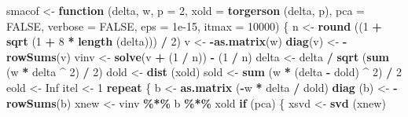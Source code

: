 \documentclass[
  12pt,
]{article}
\newenvironment{Shaded}{\begin{snugshade}}{\end{snugshade}}
\newcommand{\AttributeTok}[1]{\textcolor[rgb]{0.13,0.29,0.53}{#1}}
\newcommand{\ConstantTok}[1]{\textcolor[rgb]{0.56,0.35,0.01}{#1}}
\newcommand{\ControlFlowTok}[1]{\textcolor[rgb]{0.13,0.29,0.53}{\textbf{#1}}}
\newcommand{\DecValTok}[1]{\textcolor[rgb]{0.00,0.00,0.81}{#1}}
\newcommand{\FloatTok}[1]{\textcolor[rgb]{0.00,0.00,0.81}{#1}}
\newcommand{\FunctionTok}[1]{\textcolor[rgb]{0.13,0.29,0.53}{\textbf{#1}}}
\newcommand{\NormalTok}[1]{#1}
\newcommand{\OtherTok}[1]{\textcolor[rgb]{0.56,0.35,0.01}{#1}}
\newcommand{\SpecialCharTok}[1]{\textcolor[rgb]{0.81,0.36,0.00}{\textbf{#1}}}
\begin{document}
\begin{Shaded}
\begin{Highlighting}[]
\NormalTok{smacof }\OtherTok{\textless{}{-}}
  \ControlFlowTok{function}\NormalTok{ (delta,}
\NormalTok{            w,}
            \AttributeTok{p =} \DecValTok{2}\NormalTok{,}
            \AttributeTok{xold =} \FunctionTok{torgerson}\NormalTok{ (delta, p),}
            \AttributeTok{pca =} \ConstantTok{FALSE}\NormalTok{,}
            \AttributeTok{verbose =} \ConstantTok{FALSE}\NormalTok{,}
            \AttributeTok{eps =} \FloatTok{1e{-}15}\NormalTok{,}
            \AttributeTok{itmax =} \DecValTok{10000}\NormalTok{) \{}
\NormalTok{    n }\OtherTok{\textless{}{-}} \FunctionTok{round}\NormalTok{ ((}\DecValTok{1} \SpecialCharTok{+} \FunctionTok{sqrt}\NormalTok{ (}\DecValTok{1} \SpecialCharTok{+} \DecValTok{8} \SpecialCharTok{*} \FunctionTok{length}\NormalTok{ (delta))) }\SpecialCharTok{/} \DecValTok{2}\NormalTok{)}
\NormalTok{    v }\OtherTok{\textless{}{-}} \SpecialCharTok{{-}}\FunctionTok{as.matrix}\NormalTok{(w)}
    \FunctionTok{diag}\NormalTok{(v) }\OtherTok{\textless{}{-}} \SpecialCharTok{{-}}\FunctionTok{rowSums}\NormalTok{(v)}
\NormalTok{    vinv }\OtherTok{\textless{}{-}} \FunctionTok{solve}\NormalTok{(v }\SpecialCharTok{+}\NormalTok{ (}\DecValTok{1} \SpecialCharTok{/}\NormalTok{ n)) }\SpecialCharTok{{-}}\NormalTok{ (}\DecValTok{1} \SpecialCharTok{/}\NormalTok{ n)}
\NormalTok{    delta }\OtherTok{\textless{}{-}}\NormalTok{ delta }\SpecialCharTok{/} \FunctionTok{sqrt}\NormalTok{ (}\FunctionTok{sum}\NormalTok{ (w }\SpecialCharTok{*}\NormalTok{ delta }\SpecialCharTok{\^{}} \DecValTok{2}\NormalTok{) }\SpecialCharTok{/} \DecValTok{2}\NormalTok{)}
\NormalTok{    dold }\OtherTok{\textless{}{-}} \FunctionTok{dist}\NormalTok{ (xold)}
\NormalTok{    sold }\OtherTok{\textless{}{-}} \FunctionTok{sum}\NormalTok{ (w }\SpecialCharTok{*}\NormalTok{ (delta }\SpecialCharTok{{-}}\NormalTok{ dold) }\SpecialCharTok{\^{}} \DecValTok{2}\NormalTok{) }\SpecialCharTok{/} \DecValTok{2}
\NormalTok{    eold }\OtherTok{\textless{}{-}} \ConstantTok{Inf}
\NormalTok{    itel }\OtherTok{\textless{}{-}} \DecValTok{1}
    \ControlFlowTok{repeat}\NormalTok{ \{}
\NormalTok{      b }\OtherTok{\textless{}{-}} \FunctionTok{as.matrix}\NormalTok{ (}\SpecialCharTok{{-}}\NormalTok{w }\SpecialCharTok{*}\NormalTok{ delta }\SpecialCharTok{/}\NormalTok{ dold)}
      \FunctionTok{diag}\NormalTok{ (b) }\OtherTok{\textless{}{-}} \SpecialCharTok{{-}}\FunctionTok{rowSums}\NormalTok{(b)}
\NormalTok{      xnew }\OtherTok{\textless{}{-}}\NormalTok{ vinv }\SpecialCharTok{\%*\%}\NormalTok{ b }\SpecialCharTok{\%*\%}\NormalTok{ xold}
      \ControlFlowTok{if}\NormalTok{ (pca) \{}
\NormalTok{        xsvd }\OtherTok{\textless{}{-}} \FunctionTok{svd}\NormalTok{ (xnew)}

\end{Highlighting}
\end{Shaded}
\end{document}
